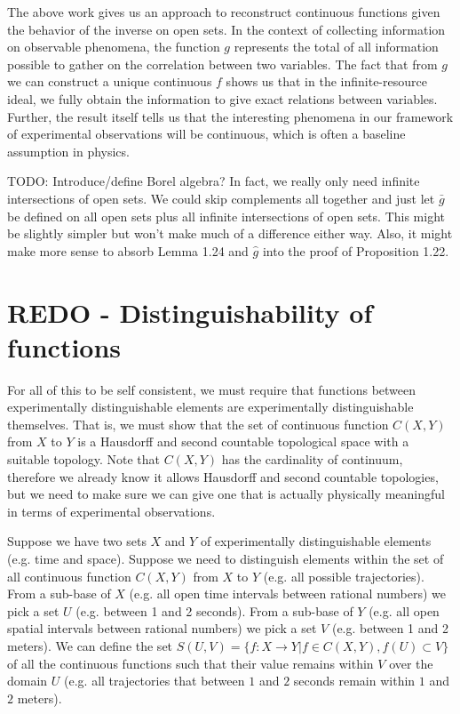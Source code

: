 \documentclass[11pt,letterpaper,fleqn]{memoir} %
\begin{document}
The above work gives us an approach to reconstruct continuous functions given the behavior of the inverse on open sets. In the context of collecting information on observable phenomena, the function $g$ represents the total of all information possible to gather on the correlation between two variables. The fact that from $g$ we can construct a unique continuous $f$ shows us that in the infinite-resource ideal, we fully obtain the information to give exact relations between variables. Further, the result itself tells us that the interesting phenomena in our framework of experimental observations will be continuous, which is often a baseline assumption in physics. 





TODO: Introduce/define Borel algebra? In fact, we really only need infinite intersections of open sets. We could skip complements all together and just let $\bar{g}$ be defined on all open sets plus all infinite intersections of open sets. This might be slightly simpler but won't make much of a difference either way. Also, it might make more sense to absorb Lemma 1.24 and $\hat{g}$ into the proof of Proposition 1.22. 

\section{REDO - Distinguishability of functions}

For all of this to be self consistent, we must require that functions between experimentally distinguishable elements are  experimentally distinguishable themselves. That is, we must show that the set of continuous function $C(X,Y)$ from $X$ to $Y$ is a Hausdorff and second countable topological space with a suitable topology. Note that $C(X,Y)$ has the cardinality of continuum, therefore we already know it allows Hausdorff and second countable topologies, but we need to make sure we can give one that is actually physically meaningful in terms of experimental observations.

Suppose we have two sets $X$ and $Y$ of experimentally distinguishable elements (e.g. time and space). Suppose we need to distinguish elements within the set of all continuous function $C(X,Y)$ from $X$ to $Y$ (e.g. all possible trajectories). From a sub-base of $X$ (e.g. all open time intervals between rational numbers) we pick a set $U$ (e.g. between 1 and 2 seconds). From a sub-base of $Y$ (e.g. all open spatial intervals between rational numbers) we pick a set $V$ (e.g. between 1 and 2 meters). We can define the set $S(U,V) = \{f: X \rightarrow Y | f \in C(X,Y), f(U) \subset V\}$ of all the continuous functions such that their value remains within $V$ over the domain $U$ (e.g. all trajectories that between $1$ and $2$ seconds remain within $1$ and $2$ meters).
\end{document}
